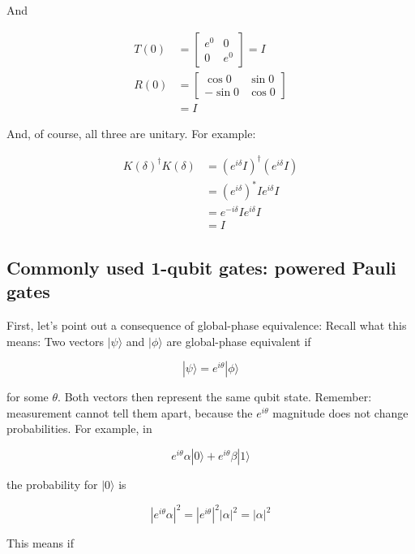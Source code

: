 \documentclass[main.tex]{subfiles}
\begin{document}
    And
    
    $$
    \begin{aligned}
    T(0) &=\left[\begin{array}{cc}
    e^{0} & 0 \\
    0 & e^{0}
    \end{array}\right]=I \\
    R(0) &=\left[\begin{array}{cc}
    \cos 0 & \sin 0 \\
    -\sin 0 & \cos 0
    \end{array}\right] \\
    &=I
    \end{aligned}
    $$
    
    And, of course, all three are unitary. For example:
    
    $$
    \begin{aligned}
    K(\delta)^{\dagger} K(\delta) &=\left(e^{i \delta} I\right)^{\dagger}\left(e^{i \delta} I\right) \\
    &=\left(e^{i \delta}\right)^{*} I e^{i \delta} I \\
    &=e^{-i \delta} I e^{i \delta} I \\
    &=I
    \end{aligned}
    $$
    
\subsection{Commonly used 1-qubit gates: powered Pauli gates}

    First, let's point out a consequence of global-phase equivalence: Recall what this means: Two vectors $|\psi\rangle$ and $|\phi\rangle$ are global-phase equivalent if
    
    $$
    |\psi\rangle=e^{i \theta}|\phi\rangle
    $$
    
    for some $\theta$. Both vectors then represent the same qubit state. Remember: measurement cannot tell them apart, because the $e^{i \theta}$ magnitude does not change probabilities. For example, in
    
    $$
    e^{i \theta} \alpha|0\rangle+e^{i \theta} \beta|1\rangle
    $$
    
    the probability for $|0\rangle$ is
    
    $$
    \left|e^{i \theta} \alpha\right|^{2}=\left|e^{i \theta}\right|^{2}|\alpha|^{2}=|\alpha|^{2}
    $$
    
    This means if
    
\end{document}
